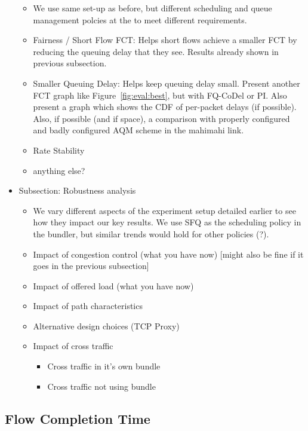 \begin{itemize}
    \begin{itemize}
        \item We use same set-up as before, but different scheduling and queue management polcies at the \name to meet different requirements. 
        \item Fairness / Short Flow FCT: Helps short flows achieve a smaller FCT by reducing the queuing delay that they see. Results already shown in previous subsection. 
        \item Smaller Queuing Delay: Helps keep queuing delay small. Present another FCT graph like Figure~\ref{fig:eval:best}, but with FQ-CoDel or PI. Also present a graph which shows the CDF of per-packet delays (if possible). Also, if possible (and if space), a comparison with properly configured and badly configured AQM scheme in the mahimahi link.
        \item Rate Stability
        \item anything else? 
    \end{itemize}
    \item Subsection: Robustness analysis
    \begin{itemize}
        \item We vary different aspects of the experiment setup detailed earlier to see how they impact our key results. We use SFQ as the scheduling policy in the bundler, but similar trends would hold for other policies (?). 
        \item Impact of congestion control (what you have now) [might also be fine if it goes in the previous subsection]
        \item Impact of offered load (what you have now)
        \item Impact of path characteristics
        \item Alternative design choices (TCP Proxy)
        \item Impact of cross traffic
        \begin{itemize}
            \item Cross traffic in it's own bundle
            \item Cross traffic not using bundle
        \end{itemize}
    \end{itemize}
\end{itemize}
\radhika{*/}


\subsection{Flow Completion Time}\label{s:eval:fct}

